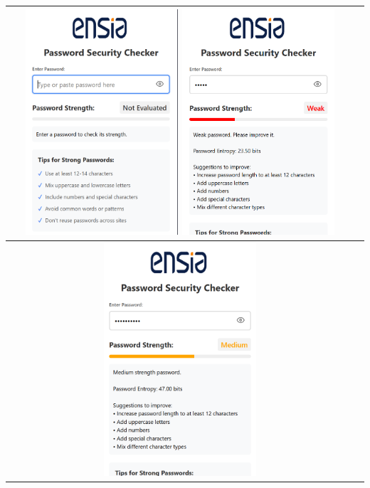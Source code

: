 \documentclass[11pt,oneside,a4paper]{book}
\begin{document}
\begin{itemize}
\begin{table}[H]
  \centering
  \begin{tabular}{|c|c|}
    \hline
    \includegraphics[width=0.45\textwidth]{type.png}
    \includegraphics[width=0.45\textwidth]{low.png} \\
    \hline
    \includegraphics[width=0.45\textwidth]{medium.png}

\end{tabular}
\end{table}
\end{itemize}
\end{document}
